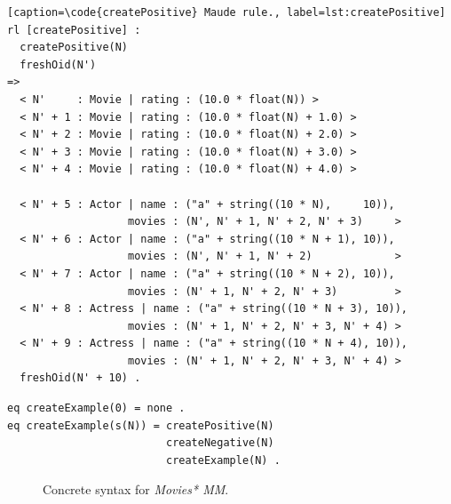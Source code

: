 \documentclass[draft]{llncs}
\newcommand{\code}[1]{{\texttt{#1}}}
\begin{document}
\begin{lstlisting}[caption=\code{createPositive} Maude rule., label=lst:createPositive]
rl [createPositive] :
  createPositive(N)
  freshOid(N')
=>
  < N'     : Movie | rating : (10.0 * float(N)) >
  < N' + 1 : Movie | rating : (10.0 * float(N) + 1.0) >
  < N' + 2 : Movie | rating : (10.0 * float(N) + 2.0) >
  < N' + 3 : Movie | rating : (10.0 * float(N) + 3.0) >
  < N' + 4 : Movie | rating : (10.0 * float(N) + 4.0) >
  
  < N' + 5 : Actor | name : ("a" + string((10 * N),     10)),
                   movies : (N', N' + 1, N' + 2, N' + 3)     >
  < N' + 6 : Actor | name : ("a" + string((10 * N + 1), 10)),
                   movies : (N', N' + 1, N' + 2)             >
  < N' + 7 : Actor | name : ("a" + string((10 * N + 2), 10)),
                   movies : (N' + 1, N' + 2, N' + 3)         >
  < N' + 8 : Actress | name : ("a" + string((10 * N + 3), 10)),
                   movies : (N' + 1, N' + 2, N' + 3, N' + 4) >
  < N' + 9 : Actress | name : ("a" + string((10 * N + 4), 10)),
                   movies : (N' + 1, N' + 2, N' + 3, N' + 4) >
  freshOid(N' + 10) .
\end{lstlisting}

\begin{lstlisting}[label=lst:createexampleeq, caption=Equation \code{createExample(N:Nat)}.]
eq createExample(0) = none .
eq createExample(s(N)) = createPositive(N)
                         createNegative(N)
                         createExample(N) .
\end{lstlisting}


\begin{figure}[htp]
  \hfill
  \hfill
  \hfill
  \hfill
  \caption{Concrete syntax for \textit{Movies* MM}.}
  \label{fig:concreteSyntax}
\end{figure}
\end{document}
